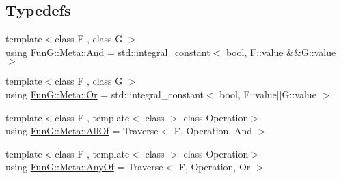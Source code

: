 \subsection*{Typedefs}
\begin{DoxyCompactItemize}
\item 
{\footnotesize template$<$class F , class G $>$ }\\using \hyperlink{namespaceFunG_1_1Meta_a6f0fce21e31ab8fdc307eddead3b8d66}{Fun\-G\-::\-Meta\-::\-And} = std\-::integral\-\_\-constant$<$ bool, F\-::value \&\&G\-::value $>$
\item 
{\footnotesize template$<$class F , class G $>$ }\\using \hyperlink{namespaceFunG_1_1Meta_a54cebc5541fa7677e239a9b7a84aba7e}{Fun\-G\-::\-Meta\-::\-Or} = std\-::integral\-\_\-constant$<$ bool, F\-::value$\vert$$\vert$G\-::value $>$
\item 
{\footnotesize template$<$class F , template$<$ class $>$ class Operation$>$ }\\using \hyperlink{namespaceFunG_1_1Meta_aa62ce805a20b342ffc1947c210be3501}{Fun\-G\-::\-Meta\-::\-All\-Of} = Traverse$<$ F, Operation, And $>$
\item 
{\footnotesize template$<$class F , template$<$ class $>$ class Operation$>$ }\\using \hyperlink{namespaceFunG_1_1Meta_a54a94493bb1caa42606dd7e6744abf8c}{Fun\-G\-::\-Meta\-::\-Any\-Of} = Traverse$<$ F, Operation, Or $>$
\end{DoxyCompactItemize}

